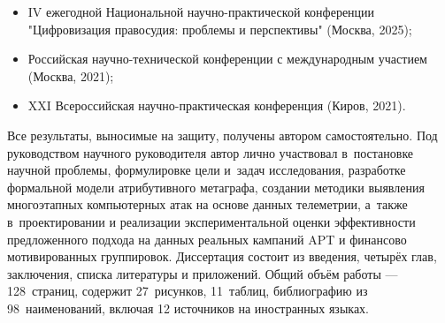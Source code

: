 \noindent
\begin{itemize}
    \item IV ежегодной Национальной научно-практической конференции "Цифровизация правосудия: проблемы и перспективы" (Москва, 2025);
    \item Российская научно-технической конференции с международным участием  (Москва, 2021);
    \item XXI Всероссийская научно-практическая конференция (Киров, 2021).
\end{itemize}

{\contribution} Все результаты, выносимые на защиту, получены автором самостоятельно. Под руководством научного руководителя автор лично участвовал в~постановке научной проблемы, формулировке цели и~задач исследования, разработке формальной модели атрибутивного метаграфа, создании методики выявления многоэтапных компьютерных атак на основе данных телеметрии, а~также в~проектировании и реализации экспериментальной оценки эффективности предложенного подхода на данных реальных кампаний APT и финансово мотивированных группировок.
\ifsynopsis
{\structure}
\else
\fi
Диссертация состоит из введения, четырёх глав, заключения, списка литературы и приложений.
Общий объём работы — 128~страниц, содержит 27~рисунков, 11~таблиц,
библиографию из 98~наименований, включая 12 источников на иностранных языках.

